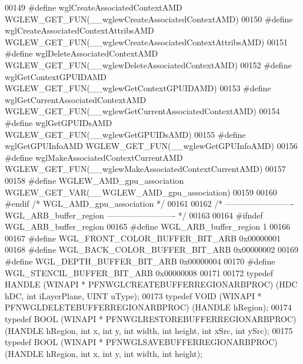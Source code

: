 \begin{DoxyCode}
00149 \textcolor{preprocessor}{#define wglCreateAssociatedContextAMD WGLEW\_GET\_FUN(\_\_wglewCreateAssociatedContextAMD)}
00150 \textcolor{preprocessor}{#define wglCreateAssociatedContextAttribsAMD WGLEW\_GET\_FUN(\_\_wglewCreateAssociatedContextAttribsAMD)}
00151 \textcolor{preprocessor}{#define wglDeleteAssociatedContextAMD WGLEW\_GET\_FUN(\_\_wglewDeleteAssociatedContextAMD)}
00152 \textcolor{preprocessor}{#define wglGetContextGPUIDAMD WGLEW\_GET\_FUN(\_\_wglewGetContextGPUIDAMD)}
00153 \textcolor{preprocessor}{#define wglGetCurrentAssociatedContextAMD WGLEW\_GET\_FUN(\_\_wglewGetCurrentAssociatedContextAMD)}
00154 \textcolor{preprocessor}{#define wglGetGPUIDsAMD WGLEW\_GET\_FUN(\_\_wglewGetGPUIDsAMD)}
00155 \textcolor{preprocessor}{#define wglGetGPUInfoAMD WGLEW\_GET\_FUN(\_\_wglewGetGPUInfoAMD)}
00156 \textcolor{preprocessor}{#define wglMakeAssociatedContextCurrentAMD WGLEW\_GET\_FUN(\_\_wglewMakeAssociatedContextCurrentAMD)}
00157 
00158 \textcolor{preprocessor}{#define WGLEW\_AMD\_gpu\_association WGLEW\_GET\_VAR(\_\_WGLEW\_AMD\_gpu\_association)}
00159 
00160 \textcolor{preprocessor}{#endif }\textcolor{comment}{/* WGL\_AMD\_gpu\_association */}\textcolor{preprocessor}{}
00161 
00162 \textcolor{comment}{/* ------------------------- WGL\_ARB\_buffer\_region ------------------------- */}
00163 
00164 \textcolor{preprocessor}{#ifndef WGL\_ARB\_buffer\_region}
00165 \textcolor{preprocessor}{#define WGL\_ARB\_buffer\_region 1}
00166 
00167 \textcolor{preprocessor}{#define WGL\_FRONT\_COLOR\_BUFFER\_BIT\_ARB 0x00000001}
00168 \textcolor{preprocessor}{#define WGL\_BACK\_COLOR\_BUFFER\_BIT\_ARB 0x00000002}
00169 \textcolor{preprocessor}{#define WGL\_DEPTH\_BUFFER\_BIT\_ARB 0x00000004}
00170 \textcolor{preprocessor}{#define WGL\_STENCIL\_BUFFER\_BIT\_ARB 0x00000008}
00171 
00172 \textcolor{keyword}{typedef} HANDLE (WINAPI * PFNWGLCREATEBUFFERREGIONARBPROC) (HDC hDC, \textcolor{keywordtype}{int} 
      iLayerPlane, UINT uType);
00173 \textcolor{keyword}{typedef} VOID (WINAPI * PFNWGLDELETEBUFFERREGIONARBPROC) (HANDLE hRegion);
00174 \textcolor{keyword}{typedef} BOOL (WINAPI * PFNWGLRESTOREBUFFERREGIONARBPROC) (HANDLE hRegion, \textcolor{keywordtype}{int} x, \textcolor{keywordtype}{int} 
      y, \textcolor{keywordtype}{int} width, \textcolor{keywordtype}{int} height, \textcolor{keywordtype}{int} xSrc, \textcolor{keywordtype}{int} ySrc);
00175 \textcolor{keyword}{typedef} BOOL (WINAPI * PFNWGLSAVEBUFFERREGIONARBPROC) (HANDLE hRegion, \textcolor{keywordtype}{int} x, \textcolor{keywordtype}{int} 
      y, \textcolor{keywordtype}{int} width, \textcolor{keywordtype}{int} height);

\end{DoxyCode}
